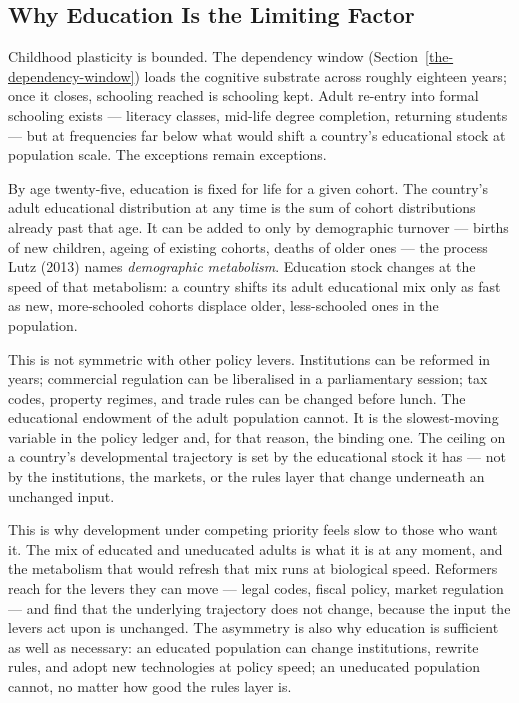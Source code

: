\documentclass[12pt,letterpaper]{article}
\begin{document}
\subsection{Why Education Is the Limiting Factor}\label{education-as-limiting-factor}

Childhood plasticity is bounded. The dependency window
(Section~\ref{the-dependency-window}) loads the cognitive substrate
across roughly eighteen years; once it closes, schooling reached
is schooling kept. Adult re-entry into formal schooling exists ---
literacy classes, mid-life degree completion, returning students
--- but at frequencies far below what would shift a country's
educational stock at population scale. The exceptions remain
exceptions.

By age twenty-five, education is fixed for life for a given cohort.
The country's adult educational distribution at any time is the sum
of cohort distributions already past that age. It can be added to
only by demographic turnover --- births of new children, ageing of
existing cohorts, deaths of older ones --- the process Lutz (2013)
names \emph{demographic metabolism}. Education stock changes at
the speed of that metabolism: a country shifts its adult
educational mix only as fast as new, more-schooled cohorts displace
older, less-schooled ones in the population.

This is not symmetric with other policy levers. Institutions can be
reformed in years; commercial regulation can be liberalised in a
parliamentary session; tax codes, property regimes, and trade rules
can be changed before lunch. The educational endowment of the adult
population cannot. It is the slowest-moving variable in the policy
ledger and, for that reason, the binding one. The ceiling on a
country's developmental trajectory is set by the educational stock
it has --- not by the institutions, the markets, or the rules layer
that change underneath an unchanged input.

This is why development under competing priority feels slow to
those who want it. The mix of educated and uneducated adults is
what it is at any moment, and the metabolism that would refresh
that mix runs at biological speed. Reformers reach for the levers
they can move --- legal codes, fiscal policy, market regulation
--- and find that the underlying trajectory does not change,
because the input the levers act upon is unchanged. The asymmetry
is also why education is sufficient as well as necessary: an
educated population can change institutions, rewrite rules, and
adopt new technologies at policy speed; an uneducated population
cannot, no matter how good the rules layer is.
\end{document}
